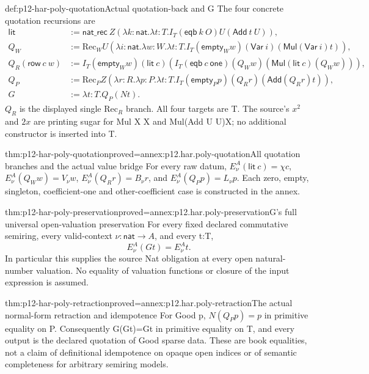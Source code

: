 \begin{hbdefinition}{def:p12-har-poly-quotation}{Actual quotation-back and G}
The four concrete quotation recursions are
\[
\begin{aligned}
 \mathsf{lit}&:=\mathsf{nat\_rec}\ Z
    (\lambda k:\mathsf{nat}.\lambda t:T.
        I_T(\mathsf{eqb}\ k\ O)U(\mathsf{Add}\ t\ U)),\\
 Q_W&:=\mathrm{Rec}_W U
    (\lambda i:\mathsf{nat}.\lambda w:W.\lambda t:T.
       I_T(\mathsf{empty}_W w)(\mathsf{Var}\ i)
                    (\mathsf{Mul}(\mathsf{Var}\ i)t)),\\
 Q_R(\mathsf{row}\ c\ w)&:=
   I_T(\mathsf{empty}_W w)(\mathsf{lit}\ c)
      (I_T(\mathsf{eqb}\ c\ \mathsf{one})(Q_Ww)
                          (\mathsf{Mul}(\mathsf{lit}\ c)(Q_Ww))),\\
 Q_P&:=\mathrm{Rec}_P Z
   (\lambda r:R.\lambda p:P.\lambda t:T.
        I_T(\mathsf{empty}_P p)(Q_Rr)(\mathsf{Add}(Q_Rr)t)),\\
 G&:=\lambda t:T.Q_P(Nt).
\end{aligned}
\]
\(Q_R\) is the displayed single \(\mathrm{Rec}_R\) branch. All four targets are T.
The source's \(x^2\) and \(2x\) are printing sugar for Mul X X and
Mul(Add U U)X; no additional constructor is inserted into T.
\end{hbdefinition}

\begin{hblemma}{thm:p12-har-poly-quotation}{proved=annex:p12.har.poly-quotation}{All quotation branches and the actual value bridge}
For every raw datum,
\(E_\nu^A(\mathsf{lit}\ c)=\chi c\),
\(E_\nu^A(Q_W w)=V_\nu w\),
\(E_\nu^A(Q_R r)=B_\nu r\), and
\(E_\nu^A(Q_P p)=L_\nu p\).
Each zero, empty, singleton, coefficient-one and other-coefficient case
is constructed in the annex.
\end{hblemma}

\begin{hbtheorem}{thm:p12-har-poly-preservation}{proved=annex:p12.har.poly-preservation}{G's full universal open-valuation preservation}
For every fixed declared commutative semiring, every valid-context
\(\nu:\mathsf{nat}\to A\), and every t:T,
\[
 E_\nu^A(Gt)=E_\nu^A t.
\]
In particular this supplies the source Nat obligation at every open
natural-number valuation. No equality of valuation functions or closure
of the input expression is assumed.
\end{hbtheorem}

\begin{hbtheorem}{thm:p12-har-poly-retraction}{proved=annex:p12.har.poly-retraction}{The actual normal-form retraction and idempotence}
For Good p, \(N(Q_Pp)=p\) in primitive equality on P.
Consequently G(Gt)=Gt in primitive equality on T, and every output is
the declared quotation of Good sparse data. These are book equalities,
not a claim of definitional idempotence on opaque open indices or of
semantic completeness for arbitrary semiring models.
\end{hbtheorem}

